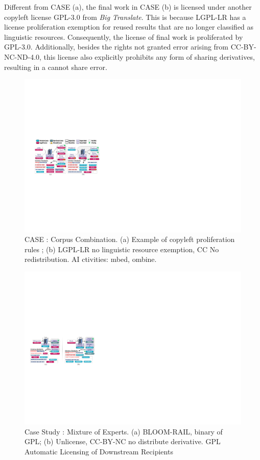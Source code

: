  Different from CASE  (a), the final work in CASE  (b) is licensed under another copyleft license GPL-3.0 from \textit{Big Translate}.
This is because LGPL-LR has a license proliferation exemption for reused results that are no longer classified as linguistic resources.
Consequently, the license of final work is proliferated by GPL-3.0.
Additionally, besides the rights not granted error arising from CC-BY-NC-ND-4.0, this license also explicitly prohibits any form of sharing derivatives, resulting in a cannot share error.

\begin{figure}[t]
    \centering
    \includegraphics[width=\linewidth]{fig/case1.pdf}
    \caption{CASE : Corpus Combination. (a) Example of copyleft proliferation rules ; (b) LGPL-LR no linguistic resource exemption, CC No redistribution. AI ctivities: mbed, ombine.}
    \Description{}
    \label{fig:case1}
\end{figure}

\begin{figure}[t]
    \centering
    \includegraphics[width=\linewidth]{fig/case2.pdf}
    \caption{Case Study : Mixture of Experts. (a) BLOOM-RAIL, binary of GPL; (b) Unlicense, CC-BY-NC no distribute derivative. GPL Automatic Licensing of Downstream Recipients}
    \Description{}
    \label{fig:case2}
\end{figure}

